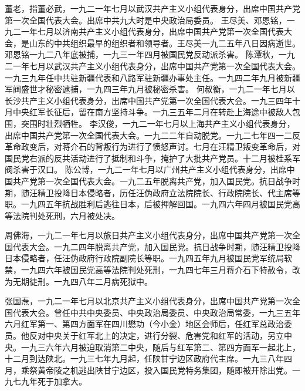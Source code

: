 \begin{maonote}
董老，指董必武，一九二一年七月以武汉共产主义小组代表身分，出席中国共产党第一次全国代表大会。出席中共九大时是中央政治局委员。
王尽美、邓恩铭，一九二一年七月以济南共产主义小组代表身分，出席中国共产党第一次全国代表大会，是山东的中共组织最早的组织者和领导者。王尽美一九二五年八日因病逝世。邓恩铭一九二八年底被捕，一九三一年四月被国民党反动派杀害。
陈潭秋，一九二一年七月以武汉共产主义小组代表身分，出席中国共产党第一次全国代表大会。一九三九年任中共驻新疆代表和八路军驻新疆办事处主任。一九四二年九月被新疆军阀盛世才秘密逮捕，一九四三年九月被秘密杀害。
何叔衡，一九二一年七月以长沙共产主义小组代表身分，出席中国共产党第一次全国代表大会。一九三四年十月中央红军长征后，留在南方坚持斗争。一九三五年二月在转赴上海途中被敌人包围，突围时壮烈牺牲。
李汉俊，一九二一年七月以上海共产主义小组代表身分，出席中国共产党第一次全国代表大会。一九二二年自动脱党。一九二七年四一二反革命政变后，对蒋介石的背叛行为进行了愤怒声讨。七月在汪精卫叛变革命后，对国民党右派的反共活动进行了抵制和斗争，掩护了大批共产党员。十二月被桂系军阀杀害于汉口。
陈公博，一九二一年七月以广州共产主义小组代表身分，出席中国共产党第一次全国代表大会。一九二五年脱离共产党，加入国民党。抗日战争时期，随汪精卫投降日本侵略者，历任汪伪政府立法院院长、行政院院长、代主席等职。一九四五年抗战胜利后逃往日本，后被押解回国。一九四六年四月被国民党高等法院判处死刑，六月被处决。

周佛海，一九二一年七月以旅日共产主义小组代表身分，出席中国共产党第一次全国代表大会。一九二四年脱离共产党，加入国民党。抗日战争时期，随汪精卫投降日本侵略者，任汪伪政府行政院副院长等职。一九四五年九月被国民党军统局软禁，一九四六年被国民党高等法院判处死刑，一九四七年三月蒋介石下特赦令，改为无期徒刑。一九四八年二月病死狱中。

张国焘，一九二一年七月以北京共产主义小组代表身分，出席中国共产党第一次全国代表大会。曾任中共中央委员、中央政治局委员、中央政治局常委，一九三五年六月红军第一、第四方面军在四川懋功（今小金）地区会师后，任红军总政治委员。他反对中央关于红军北上的决定，进行分裂、危害党和红军的活动，另立中央。一九三六年六月被迫取消第二中央，随后与红军第二、第四方面军一起北上，十二月到达陕北。一九三七年九月起，任陕甘宁边区政府代主席。一九三八年四月，乘祭黄帝陵之机逃出陕甘宁边区，投入国民党特务集团，随即被开除出党。一九七九年死于加拿大。


\end{maonote}
